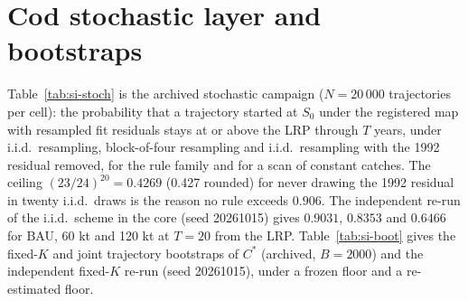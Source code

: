 \documentclass[11pt,a4paper]{article}
\newcommand{\Cstar}{C^{*}}
\begin{document}
\section{Cod stochastic layer and bootstraps}\label{si:cod-stoch}
Table~\ref{tab:si-stoch} is the archived stochastic campaign ($N=20\,000$ trajectories per cell): the probability that a trajectory started at $S_0$ under the registered map with resampled fit residuals stays at or above the LRP through $T$ years, under i.i.d.\ resampling, block-of-four resampling and i.i.d.\ resampling with the 1992 residual removed, for the rule family and for a scan of constant catches. The ceiling $(23/24)^{20}=0.4269$ (0.427 rounded) for never drawing the 1992 residual in twenty i.i.d.\ draws is the reason no rule exceeds $0.906$. The independent re-run of the i.i.d.\ scheme in the core (seed 20261015) gives $0.9031$, $0.8353$ and $0.6466$ for BAU, 60 kt and 120 kt at $T=20$ from the LRP. Table~\ref{tab:si-boot} gives the fixed-$K$ and joint trajectory bootstraps of $\Cstar$ (archived, $B=2000$) and the independent fixed-$K$ re-run (seed 20261015), under a frozen floor and a re-estimated floor.
\begingroup\footnotesize\setlength{\tabcolsep}{3pt}
\end{document}
